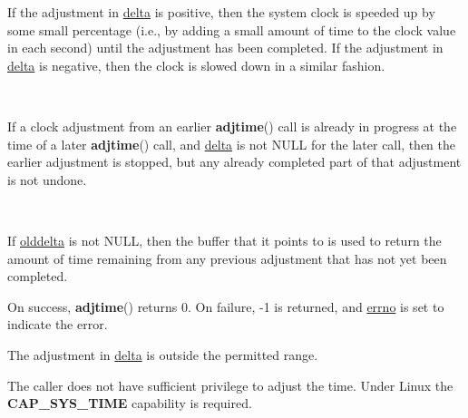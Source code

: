 \documentclass[]{article}
\let\realtextbf=\textbf
\renewcommand{\textbf}[1]{\textcolor{boldcolor}{\realtextbf{#1}}}
\renewcommand{\emph}[1]{\underline{#1}}
\begin{document}
If the adjustment in \emph{delta} is positive, then the system clock is
speeded up by some small percentage (i.e., by adding a small amount of
time to the clock value in each second) until the adjustment has been
completed. If the adjustment in \emph{delta} is negative, then the clock
is slowed down in a similar fashion.

~

If a clock adjustment from an earlier \textbf{adjtime}() call is already
in progress at the time of a later \textbf{adjtime}() call, and
\emph{delta} is not NULL for the later call, then the earlier adjustment
is stopped, but any already completed part of that adjustment is not
undone.

~

If \emph{olddelta} is not NULL, then the buffer that it points to is
used to return the amount of time remaining from any previous adjustment
that has not yet been completed.


On success, \textbf{adjtime}() returns 0. On failure, -1 is returned,
and \emph{errno} is set to indicate the error.


\begin{description}
\itemsep1pt\parskip0pt
\item[\textbf{EINVAL}]
The adjustment in \emph{delta} is outside the permitted range.
\end{description}

\begin{description}
\itemsep1pt\parskip0pt
\item[\textbf{EPERM}]
The caller does not have sufficient privilege to adjust the time. Under
Linux the \textbf{CAP\_SYS\_TIME} capability is required.
\end{description}

\end{document}
